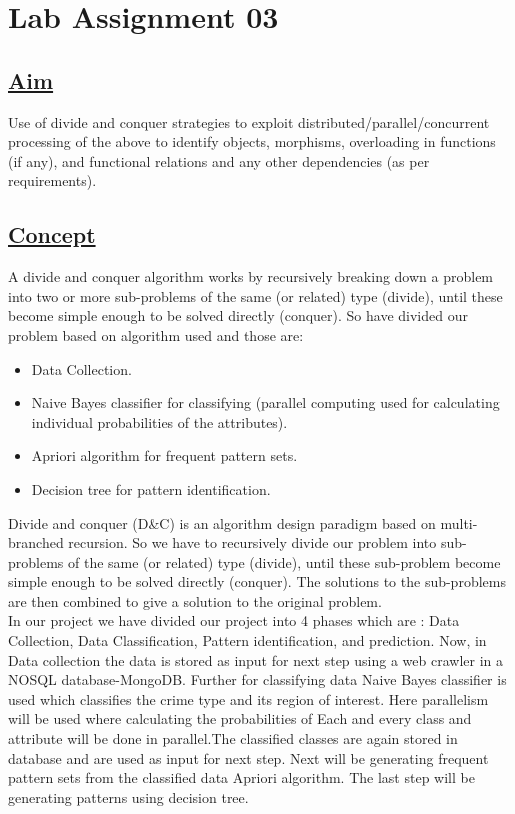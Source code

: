 \newpage
\section*{\centering\LARGE{Lab Assignment 03}}
\subsection*{\underline{Aim}}
Use of divide and conquer strategies to exploit distributed/parallel/concurrent processing of the above to identify objects, morphisms, overloading in functions (if any), and functional relations and any other dependencies (as per requirements).
\subsection*{\underline{Concept}}
A divide and conquer algorithm works by recursively breaking down a problem into two or more sub-problems of the same (or related) type (divide), until these become simple enough to be solved directly (conquer). So have divided our problem based on algorithm used and those are:
\begin{itemize}
\item Data Collection.
\item Naive Bayes classifier for classifying (parallel computing used for calculating individual probabilities of the attributes).
\item Apriori algorithm for frequent pattern sets.
\item Decision tree for pattern identification.
\end{itemize}

\vspace*{0.4cm}
\noindent
\hspace{5em}Divide and conquer (D\&C) is an algorithm design paradigm based on multi-branched recursion. So we have to recursively divide our problem into  sub-problems  of the same (or related) type (divide), until these sub-problem become simple enough to be solved directly (conquer). The solutions to the sub-problems are then combined to give a solution to the original problem.\\

\vspace*{0.4cm}
\noindent
\hspace{5em}In our project we have divided our project into 4 phases which are : Data Collection, Data Classification, Pattern identification, and prediction. Now, in Data collection the data is stored as input for next step using a web crawler in a NOSQL database-MongoDB. Further for classifying data Naive Bayes classifier is used which classifies the crime type and its region of interest. Here parallelism will be used where  calculating the probabilities of Each and every class and attribute will be done in parallel.The classified classes are again stored in database and are used as input for next step. Next will be generating frequent pattern sets from the classified data Apriori algorithm. The last step will be generating patterns using decision tree.

